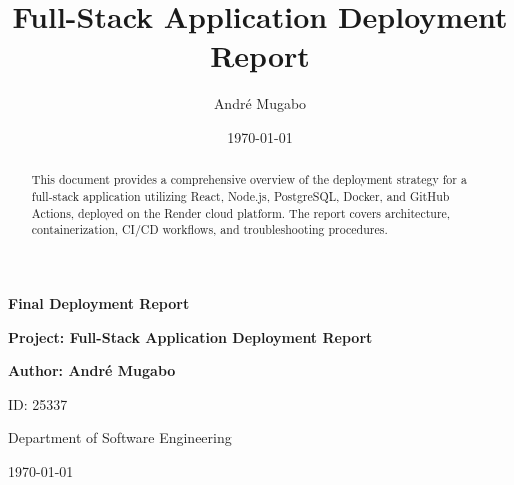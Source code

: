 \documentclass[12pt]{article}
\title{Full-Stack Application Deployment Report}
\author{André Mugabo}
\date{\today}
\begin{document}
\begin{titlepage}
    \centering
    \vspace*{2.5cm} %
    
    
    {\Huge\bfseries\sffamily\color{primary} Final Deployment Report\par}
    \vspace{0.5cm}
    
    {\LARGE\bfseries\sffamily Project: Full-Stack Application Deployment Report\par}
    \vspace{1cm}
    
    {\large\bfseries\sffamily Author: André Mugabo\par}
    {\large ID: 25337\par}
    {\large Department of Software Engineering\par}
    
    \vfill
    
    {\large \today\par}
\end{titlepage}


\newpage

\begin{abstract}
This document provides a comprehensive overview of the deployment strategy for a full-stack application utilizing React, Node.js, PostgreSQL, Docker, and GitHub Actions, deployed on the Render cloud platform. The report covers architecture, containerization, CI/CD workflows, and troubleshooting procedures.
\end{abstract}

\newpage
\tableofcontents
\newpage
\end{document}
